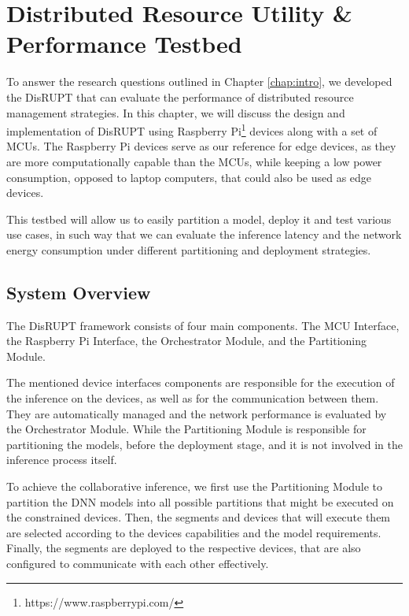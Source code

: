 \chapter{Distributed Resource Utility \&{} Performance Testbed} \label{chap:ch4}

To answer the research questions outlined in Chapter \ref{chap:intro}, 
we developed the \ac{DisRUPT}
that can evaluate the performance of distributed resource management strategies. 
In this chapter, we will discuss the design and implementation of \ac{DisRUPT} using 
Raspberry Pi\footnote{https://www.raspberrypi.com/} devices along with a set of 
\acp{MCU}. The Raspberry Pi devices serve as our reference for edge devices, as
they are more computationally capable than the \acp{MCU}, while keeping a low power
consumption, opposed to laptop computers, that could also be used as edge devices. 

This testbed will allow us to easily partition a model, deploy it and test various use 
cases, in such way that we can evaluate the inference latency and the network energy 
consumption under different partitioning and deployment strategies.

\section {System Overview} \label{sec:se41}

The \ac{DisRUPT} framework consists of four main components. The \ac{MCU} Interface,
the Raspberry Pi Interface, the Orchestrator Module, and the Partitioning Module.

The mentioned device interfaces components are responsible for the execution of the
inference on the devices, as well as for the communication between them. They are
automatically managed and the network 
performance is evaluated by the Orchestrator Module. 
While the Partitioning Module is responsible for partitioning the models, 
before the deployment stage, and it is not involved in the inference process itself.

To achieve the collaborative inference, we first use the Partitioning Module to 
partition the \ac{DNN} models into all possible partitions that might be executed on 
the constrained devices. Then, the
segments and devices that will execute them are selected according to the devices
capabilities and the model requirements. Finally, the segments are deployed to the
respective devices, that are also configured to communicate with each other effectively.

